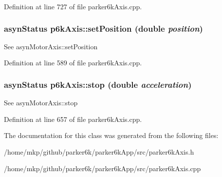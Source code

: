 Definition at line 727 of file parker6kAxis.cpp.\hypertarget{classp6kAxis_a5c5744b45ac20b37b840522fde5c3988}{
\subsubsection[{setPosition}]{\setlength{\rightskip}{0pt plus 5cm}asynStatus p6kAxis::setPosition (double {\em position})}}
\label{classp6kAxis_a5c5744b45ac20b37b840522fde5c3988}
See asynMotorAxis::setPosition 

Definition at line 589 of file parker6kAxis.cpp.\hypertarget{classp6kAxis_aa8a80a3e761b5c7df37e200924246d7c}{
\subsubsection[{stop}]{\setlength{\rightskip}{0pt plus 5cm}asynStatus p6kAxis::stop (double {\em acceleration})}}
\label{classp6kAxis_aa8a80a3e761b5c7df37e200924246d7c}
See asynMotorAxis::stop 

Definition at line 657 of file parker6kAxis.cpp.

The documentation for this class was generated from the following files:\begin{DoxyCompactItemize}
\item 
/home/mkp/github/parker6k/parker6kApp/src/parker6kAxis.h\item 
/home/mkp/github/parker6k/parker6kApp/src/parker6kAxis.cpp\end{DoxyCompactItemize}
